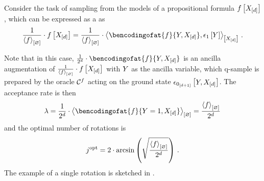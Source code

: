 \begin{example}

    Consider the task of sampling from the models of a propositional formula $f\left[X_{[d]}\right]$, which can be expressed as a \ComputationActivationNetwork{} as
    \begin{align*}
        \frac{1}{\contraction{\formula}} \cdot \formulawith
        = \frac{1}{\contraction{\formula}} \cdot \contractionof{\bencodingofat{\formula}{\headvariable,\shortcatvariables},\tbasisat{\headvariable}}{\shortcatvariables} \, .
    \end{align*}

    Note that in this case, $\frac{1}{2^{\catorder}} \cdot \bencodingofat{\formula}{\headvariable,\shortcatvariables}$ is an ancilla augmentation of $\frac{1}{\left\langle f\right\rangle_{\left[ \varnothing \right]}} \cdot f\left[X_{[d]}\right]$ with $Y$ as the ancilla variable, which q-sample is prepared by the oracle $\mathcal{C}^{f}$ acting on the ground state $\epsilon_{0_{[d+1]}}\left[Y,X_{[d]}\right]$.
    The acceptance rate is then
    \begin{align*}
        \acceptanceprob
        = \frac{1}{2^{\catorder}} \cdot \contraction{\bencodingofat{\formula}{\headvariable=1,\shortcatvariables}}
        = \frac{\contraction{\formula}}{2^{\catorder}}
    \end{align*}
    and the optimal number of rotations is
    \begin{align*}
        j^{\mathrm{opt}}
        = 2 \cdot \mathrm{arcsin}\left(\sqrt{\frac{\left\langle f\right\rangle_{\left[ \varnothing \right]}}{2^{d}}}\right) \, .
    \end{align*}
    The example of a single rotation is sketched in .

    \begin{figure}

        \begin{center}
\end{center}
\end{figure}
\end{example}
